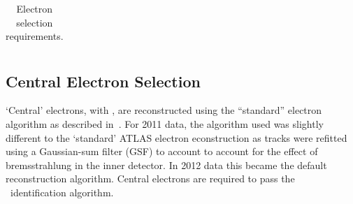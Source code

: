 \begin{table}[]
\begin{tabular}{ l  l l }
    \hline \hline
  \end{tabular}
   \caption{Electron selection requirements.}
   \label{table:objsel-el}
\end{table}

\subsection{Central Electron Selection}

`Central' electrons, with , are reconstructed using the
``standard'' electron algorithm as described in~.  For 2011
data, the algorithm used was slightly different to the `standard' ATLAS electron
econstruction as tracks were refitted using a Gaussian-sum filter (GSF) to
account to account for the effect of bremsstrahlung in the inner detector. In
2012 data this became the default reconstruction algorithm. Central electrons
are required to pass the \loosePP\ identification algorithm.

